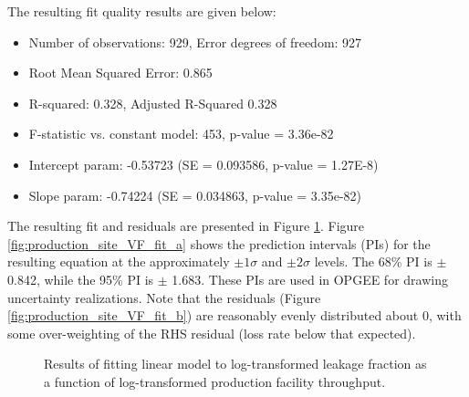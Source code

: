 \documentclass[11pt]{report}
\begin{document}
The resulting fit quality results are given below:
\begin{itemize}
\item Number of observations: 929, Error degrees of freedom: 927
\item Root Mean Squared Error: 0.865
\item R-squared: 0.328,  Adjusted R-Squared 0.328
\item F-statistic vs. constant model: 453, p-value = 3.36e-82
\item Intercept param: -0.53723 (SE = 0.093586, p-value = 1.27E-8)
\item Slope param: -0.74224 (SE = 0.034863, p-value = 3.35e-82)
\end{itemize}

The resulting fit and residuals are presented in Figure \ref{fig:production_site_VF_fit}. Figure \ref{fig:production_site_VF_fit_a} shows the prediction intervals (PIs) for the resulting equation at the approximately $\pm 1 \sigma$ and $\pm 2 \sigma$ levels. The 68\% PI is $\pm$ 0.842, while the 95\% PI is $\pm$ 1.683. These PIs are used in OPGEE for drawing uncertainty realizations. Note that the residuals (Figure \ref{fig:production_site_VF_fit_b}) are reasonably evenly distributed about 0, with some over-weighting of the RHS residual (loss rate below that expected).

\begin{figure}[tb]
\begin{center}
\hfill
{}
\hfill
\caption{Results of fitting linear model to log-transformed leakage fraction as a function of log-transformed production facility throughput.}
\label{fig:production_site_VF_fit}
\end{center}
\end{figure}
\end{document}
